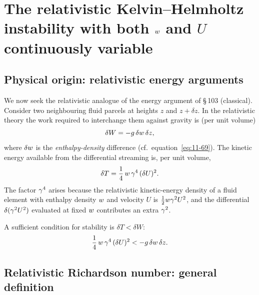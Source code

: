 \section{The relativistic Kelvin--Helmholtz instability with both
  $w$ and $U$ continuously variable}\label{sec:rel-103}

\subsection{Physical origin: relativistic energy arguments}

We now seek the relativistic analogue of the energy argument of
\S\,103 (classical).  Consider two neighbouring fluid parcels at
heights $z$ and $z+\delta z$.  In the relativistic theory the work
required to interchange them against gravity is (per unit volume)
\begin{equation}
\label{eq:rel-11-19}
\delta W = -g\,\delta w\,\delta z,
\end{equation}
where $\delta w$ is the \emph{enthalpy-density} difference
(cf.\ equation~\eqref{eq:11-69}).  The kinetic energy available from
the differential streaming is, per unit volume,
\begin{equation}
\label{eq:rel-11-20}
\delta T = \frac{1}{4}\,w\,\gamma^{4}\,(\delta U)^{2}.
\end{equation}
The factor $\gamma^{4}$ arises because the relativistic kinetic-energy
density of a fluid element with enthalpy density $w$ and
velocity $U$ is $\frac{1}{2}w\gamma^{2}U^{2}$, and the
differential $\delta(\gamma^{2}U^{2})$ evaluated at fixed $w$
contributes an extra $\gamma^{2}$.

A sufficient condition for stability is $\delta T < \delta W$:
\begin{equation}
\label{eq:rel-11-21}
\frac{1}{4}\,w\,\gamma^{4}\,(\delta U)^{2}
  < -g\,\delta w\,\delta z.
\end{equation}

\subsection{Relativistic Richardson number: general definition}

